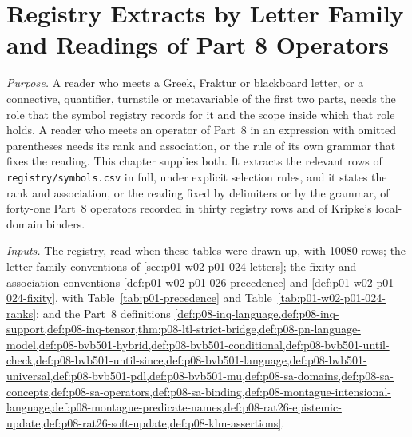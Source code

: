\chapter{Registry Extracts by Letter Family and Readings of Part 8 Operators}
\label{sec:p01-w02b-p01-012-extracts}

\emph{Purpose.}  A reader who meets a Greek, Fraktur or blackboard letter,
or a connective, quantifier, turnstile or metavariable of the first two
parts, needs the role that the symbol registry records for it and the
scope inside which that role holds.  A reader who meets an operator of
Part~8 in an expression with omitted parentheses needs its rank and
association, or the rule of its own grammar that fixes the reading.  This
chapter supplies both.  It extracts the relevant rows of
\texttt{registry/symbols.csv} in full, under explicit selection rules, and
it states the rank and association, or the reading fixed by delimiters or
by the grammar, of forty-one Part~8 operators recorded in thirty registry
rows and of Kripke's local-domain binders.

\emph{Inputs.}  The registry, read when these tables were drawn up, with
10080 rows; the letter-family conventions of
\cref{sec:p01-w02-p01-024-letters}; the fixity and association conventions
\cref{def:p01-w02-p01-026-precedence} and
\cref{def:p01-w02-p01-024-fixity}, with Table~\ref{tab:p01-precedence} and
Table~\ref{tab:p01-w02-p01-024-ranks}; and the Part~8 definitions
\cref{def:p08-inq-language,def:p08-inq-support,def:p08-inq-tensor,thm:p08-ltl-strict-bridge,def:p08-pn-language-model,def:p08-bvb501-hybrid,def:p08-bvb501-conditional,def:p08-bvb501-until-check,def:p08-bvb501-until-since,def:p08-bvb501-language,def:p08-bvb501-universal,def:p08-bvb501-pdl,def:p08-bvb501-mu,def:p08-sa-domains,def:p08-sa-concepts,def:p08-sa-operators,def:p08-sa-binding,def:p08-montague-intensional-language,def:p08-montague-predicate-names,def:p08-rat26-epistemic-update,def:p08-rat26-soft-update,def:p08-klm-assertions}.

